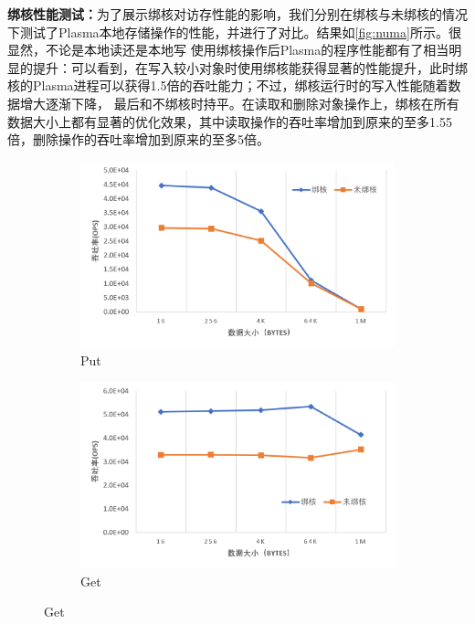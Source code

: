 \textbf{绑核性能测试：}为了展示绑核对访存性能的影响，我们分别在绑核与未绑核的情况下测试了Plasma本地存储操作的性能，并进行了对比。结果如\autoref{fig:numa}所示。很显然，不论是本地读还是本地写
使用绑核操作后Plasma的程序性能都有了相当明显的提升：可以看到，在写入较小对象时使用绑核能获得显著的性能提升，此时绑核的Plasma进程可以获得1.5倍的吞吐能力；不过，绑核运行时的写入性能随着数据增大逐渐下降，
最后和不绑核时持平。在读取和删除对象操作上，绑核在所有数据大小上都有显著的优化效果，其中读取操作的吞吐率增加到原来的至多1.55倍，删除操作的吞吐率增加到原来的至多5倍。

\begin{figure}[h]
    \begin{subfigure}{0.49\textwidth}
        \includegraphics[width=\textwidth]{image/chap04/put.png}
        \caption{Put}
    \end{subfigure}
    \begin{subfigure}{0.49\textwidth}
        \includegraphics[width=\textwidth]{image/chap04/get.png}
        \caption{Get}
    \end{subfigure}

\end{figure}
